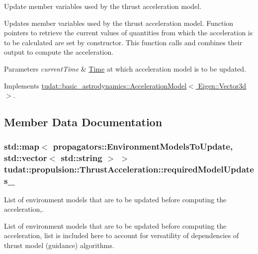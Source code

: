 Update member variables used by the thrust acceleration model. 

Updates member variables used by the thrust acceleration model. Function pointers to retrieve the current values of quantities from which the acceleration is to be calculated are set by constructor. This function calls and combines their output to compute the acceleration. 
\begin{DoxyParams}{Parameters}
{\em current\+Time} & \hyperlink{classtudat_1_1Time}{Time} at which acceleration model is to be updated. \\
\hline
\end{DoxyParams}


Implements \hyperlink{classtudat_1_1basic__astrodynamics_1_1AccelerationModel_a966e85b72300b8cbc99ba60e40108d71}{tudat\+::basic\+\_\+astrodynamics\+::\+Acceleration\+Model$<$ Eigen\+::\+Vector3d $>$}.



\subsection{Member Data Documentation}
\subsubsection[{\texorpdfstring{required\+Model\+Updates\+\_\+}{requiredModelUpdates_}}]{\setlength{\rightskip}{0pt plus 5cm}std\+::map$<$ propagators\+::\+Environment\+Models\+To\+Update, std\+::vector$<$ std\+::string $>$ $>$ tudat\+::propulsion\+::\+Thrust\+Acceleration\+::required\+Model\+Updates\+\_\+\hspace{0.3cm}{\ttfamily [protected]}}\hypertarget{classtudat_1_1propulsion_1_1ThrustAcceleration_aa83ab4b82166d24deea116386a9e55c1}{}\label{classtudat_1_1propulsion_1_1ThrustAcceleration_aa83ab4b82166d24deea116386a9e55c1}


List of environment models that are to be updated before computing the acceleration,. 

List of environment models that are to be updated before computing the acceleration, list is included here to account for versatility of dependencies of thrust model (guidance) algorithms. 
